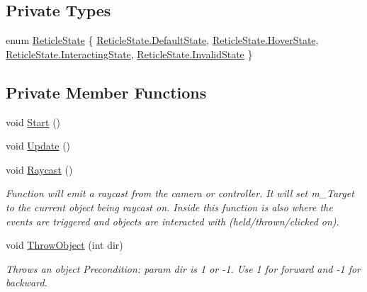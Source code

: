 \subsection*{Private Types}
\begin{DoxyCompactItemize}
\item 
enum \mbox{\hyperlink{class_v_r_standard_assets_1_1_utils_1_1_raycaster_v_r_a6d511e0bf48faef93364d51b08d53f01}{Reticle\+State}} \{ \mbox{\hyperlink{class_v_r_standard_assets_1_1_utils_1_1_raycaster_v_r_a6d511e0bf48faef93364d51b08d53f01af8bde16b37ae953ddea395cb5b07d3b2}{Reticle\+State.\+Default\+State}}, 
\mbox{\hyperlink{class_v_r_standard_assets_1_1_utils_1_1_raycaster_v_r_a6d511e0bf48faef93364d51b08d53f01a163a551828daed4f057ad272119c197b}{Reticle\+State.\+Hover\+State}}, 
\mbox{\hyperlink{class_v_r_standard_assets_1_1_utils_1_1_raycaster_v_r_a6d511e0bf48faef93364d51b08d53f01ab4f8b825102708f811a24213fe1a1b8a}{Reticle\+State.\+Interacting\+State}}, 
\mbox{\hyperlink{class_v_r_standard_assets_1_1_utils_1_1_raycaster_v_r_a6d511e0bf48faef93364d51b08d53f01aedf260198e4d75d1cb3c7588f7380120}{Reticle\+State.\+Invalid\+State}}
 \}
\end{DoxyCompactItemize}
\subsection*{Private Member Functions}
\begin{DoxyCompactItemize}
\item 
void \mbox{\hyperlink{class_v_r_standard_assets_1_1_utils_1_1_raycaster_v_r_a2a39009ca324b8f349777d3c78efa239}{Start}} ()
\item 
void \mbox{\hyperlink{class_v_r_standard_assets_1_1_utils_1_1_raycaster_v_r_a5073e9a8e781617a65ce06ebff8a0b5a}{Update}} ()
\item 
void \mbox{\hyperlink{class_v_r_standard_assets_1_1_utils_1_1_raycaster_v_r_a736d463c2ce54e52c904283f15a852b4}{Raycast}} ()
\begin{DoxyCompactList}\small\item\em Function will emit a raycast from the camera or controller. It will set {\ttfamily m\+\_\+\+Target} to the current object being raycast on. Inside this function is also where the events are triggered and objects are interacted with (held/thrown/clicked on). \end{DoxyCompactList}\item 
void \mbox{\hyperlink{class_v_r_standard_assets_1_1_utils_1_1_raycaster_v_r_ac2d0ad7b65663683c3a01c9d57f6b790}{Throw\+Object}} (int dir)
\begin{DoxyCompactList}\small\item\em Throws an object Precondition\+: param dir is 1 or -\/1. Use 1 for forward and -\/1 for backward. \end{DoxyCompactList}\end{DoxyCompactItemize}
